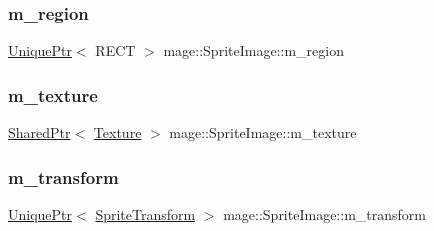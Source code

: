 \subsubsection{\texorpdfstring{m\+\_\+region}{m\_region}}
{\footnotesize\ttfamily \hyperlink{namespacemage_a8c307fbcc33bce9b7f2aa4c26c3b95cf}{Unique\+Ptr}$<$ R\+E\+CT $>$ mage\+::\+Sprite\+Image\+::m\+\_\+region\hspace{0.3cm}{\ttfamily [private]}}

\hypertarget{classmage_1_1_sprite_image_a8416fc862782dc019e15275261e7ca15}{}\label{classmage_1_1_sprite_image_a8416fc862782dc019e15275261e7ca15} 
\subsubsection{\texorpdfstring{m\+\_\+texture}{m\_texture}}
{\footnotesize\ttfamily \hyperlink{namespacemage_a1e01ae66713838a7a67d30e44c67703e}{Shared\+Ptr}$<$ \hyperlink{classmage_1_1_texture}{Texture} $>$ mage\+::\+Sprite\+Image\+::m\+\_\+texture\hspace{0.3cm}{\ttfamily [private]}}

\hypertarget{classmage_1_1_sprite_image_adcb9c0c4437cc9fe90957044cb8b76c0}{}\label{classmage_1_1_sprite_image_adcb9c0c4437cc9fe90957044cb8b76c0} 
\subsubsection{\texorpdfstring{m\+\_\+transform}{m\_transform}}
{\footnotesize\ttfamily \hyperlink{namespacemage_a8c307fbcc33bce9b7f2aa4c26c3b95cf}{Unique\+Ptr}$<$ \hyperlink{structmage_1_1_sprite_transform}{Sprite\+Transform} $>$ mage\+::\+Sprite\+Image\+::m\+\_\+transform\hspace{0.3cm}{\ttfamily [private]}}

